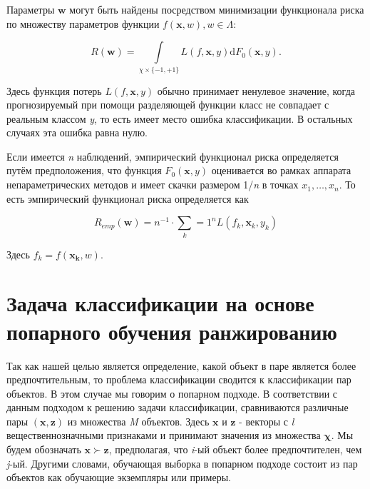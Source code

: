 \documentclass[12pt,a4paper,oneside]{article}
\begin{document}
\par
Параметры \(\mathbf{w}\) могут быть найдены посредством минимизации функционала риска по множеству параметров функции \(f(\mathbf{x}, w), w \in \Lambda\):

\[
R(\mathbf{w}) = \int \limits_{\chi \times \{-1, +1\}} L(f, \mathbf{x}, y) \mathrm{d} F_0(\mathbf{x}, y).
\]

Здесь функция потерь \(L(f, \mathbf{x}, y)\) обычно принимает ненулевое значение, когда прогнозируемый при помощи разделяющей функции класс не совпадает с реальным классом \emph{y}, то есть имеет место ошибка классификации. 
В остальных случаях эта ошибка равна нулю. 

\par
Если имеется \emph{n} наблюдений, эмпирический функционал риска определяется путём предположения, что функция \(F_0(\mathbf{x}, y)\) оценивается во рамках аппарата непараметрических методов  и имеет скачки размером 1/\emph{n} в точках \(x_1, \dots, x_n\). 
То есть эмпирический функционал риска определяется как

\[
R_{emp}(\mathbf{w}) = n^{-1} \cdot \sum \limits_k=1^n L(f_k, \mathbf{x}_k, y_k)
\]

Здесь \(f_k=f(\mathbf{x_k}, w)\). 


\section{Задача классификации на основе попарного обучения ранжированию}
\label{sec:pairwise_rank_learning_problem}

\par
Так как нашей целью является определение, какой объект в паре является более предпочтительным, то проблема классификации сводится к классификации пар объектов. 
В этом случае мы говорим о попарном подходе. 
В соответствии с данным подходом к решению задачи классификации, сравниваются различные пары \((\mathbf{x},\mathbf{z})\) из множества \emph{M} объектов. 
Здесь \(\mathbf{x}\) и \(\mathbf{z}\) - векторы с \emph{l} вещественнозначными признаками и принимают значения из множества \(\mathbf{\chi}\). 
Мы будем обозначать \(\mathbf{x} \succ \mathbf{z}\), предполагая, что \emph{i}-ый объект более предпочтителен, чем \emph{j}-ый. 
Другими словами, обучающая выборка в попарном подходе состоит из пар объектов как обучающие экземпляры или примеры. 
\end{document}
